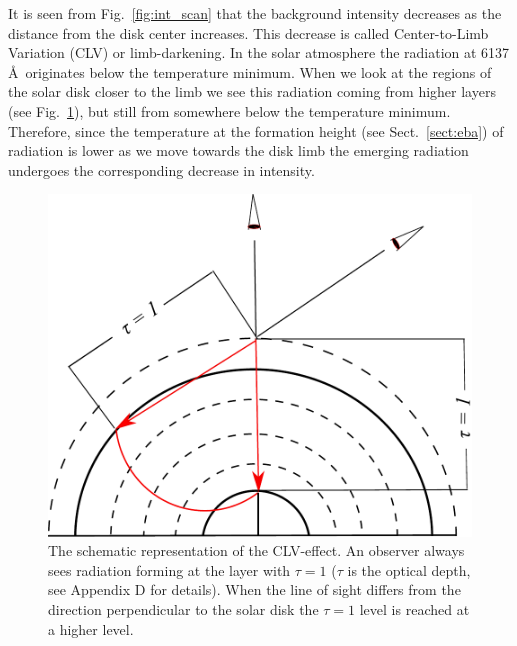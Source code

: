 \documentclass[paper=a4, fontsize=11pt]{article}
\numberwithin{equation}{section}
\numberwithin{figure}{section}
\numberwithin{table}{section}
\begin{document}
It is seen from Fig.~\ref{fig:int_scan} that the background intensity decreases 
as the distance from the disk center increases.
This decrease is called Center-to-Limb Variation (CLV) or limb-darkening.
In the solar atmosphere the radiation at 6137 \AA\ originates below the temperature minimum.
When we look at the regions of the solar disk closer to the limb we see this radiation coming 
from higher layers (see Fig.~\ref{fig:clv_eff}), but still from somewhere below the temperature minimum.
Therefore, since the temperature at the formation height (see Sect.~\ref{sect:eba}) of radiation is lower as we move towards the disk limb
the emerging radiation undergoes the corresponding decrease in intensity.
\begin{figure}[h!]
\centering
\includegraphics[scale = 0.865]{clv_eff}
\caption[]{The schematic representation of the CLV-effect.
           An observer always sees radiation forming at the layer with $\tau = 1$ 
           ($\tau$ is the optical depth, see Appendix D for details).
           When the line of sight differs from the direction perpendicular to the solar disk the
           $\tau = 1$ level is reached at a higher level.}
\label{fig:clv_eff}
\end{figure}
\end{document}
